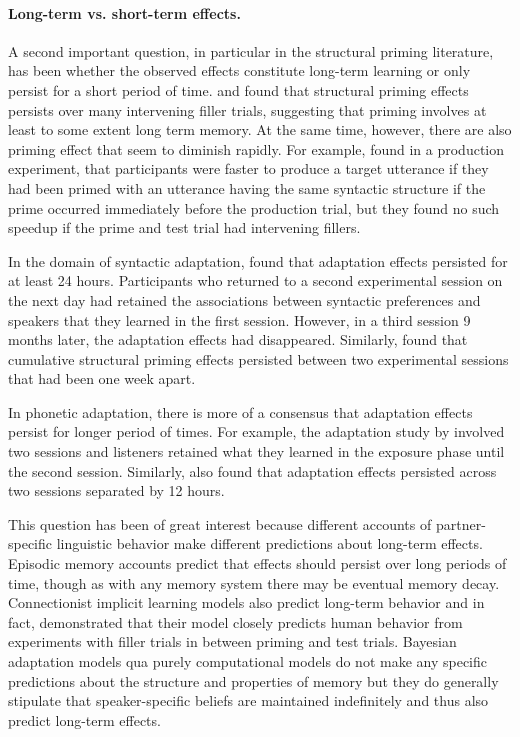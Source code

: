 \paragraph{Long-term vs. short-term effects.} A second important question, in particular in the structural priming literature, has been whether 
the observed effects constitute long-term learning or only persist for a short period of time. \cite{BockGriffin2000} and \cite{BockEtAl2007} found
that structural priming effects persists over many intervening filler trials, suggesting that priming involves at least to some extent long term
memory. At the same time, however, there are also priming effect that seem to diminish rapidly. For example, \cite{WheltonSmith2003} found
in a production experiment, that participants were faster to produce a target utterance if they had been primed with an utterance having the same
syntactic structure if the prime occurred immediately before the production trial, but they found no such speedup if the prime and test trial
had intervening fillers.

In the domain of syntactic adaptation, \cite{Krojcek2017} found that adaptation effects persisted for at least 24 hours. Participants
who returned to a second experimental session on the next day had retained the associations between syntactic preferences and speakers
that they learned in the first session. However, in a third session 9 months later, the adaptation effects had disappeared. Similarly, \cite{KaschakKuttaSchatschneider2010}
found that cumulative structural priming effects persisted between two experimental sessions that had been one week apart.

In phonetic adaptation, there is more of a consensus that adaptation effects persist for longer period of times. For example, the adaptation study by \cite{BradlowBent2007}
involved two sessions and listeners retained what they learned in the exposure phase until the second session. Similarly, \cite{XieEarleMyers2019} also found 
that adaptation effects persisted across two sessions separated by 12 hours.

This question has been of great interest because different accounts of partner-specific linguistic behavior make different predictions about long-term effects.
Episodic memory accounts predict that effects should persist over long periods of time, though as with any memory system there may be eventual memory decay. Connectionist
implicit learning models also predict long-term behavior and in fact, \cite{Chang2006} demonstrated that their model closely predicts human behavior from experiments with filler trials
in between priming and test trials. Bayesian adaptation models qua purely computational models \cite{Marr1982} do not make any specific predictions about the structure and properties of memory
 but they do generally stipulate that speaker-specific beliefs are maintained indefinitely and thus also predict long-term effects.  
 
